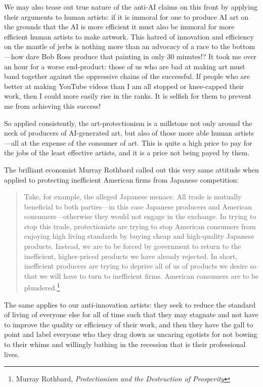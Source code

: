 \documentclass[11pt]{article}
\begin{document}
We may also tease out true nature of the anti-AI claims on this front by applying their arguments to human artists: if it is immoral for one to produce AI art on the grounds that the AI is more efficient it must also be immoral for more efficient human artists to make artwork. This hatred of innovation and efficiency on the mantle of jerbs is nothing more than an advocacy of a race to the bottom---how dare Bob Ross produce that painting in only 30 minutes!? It took me over an hour for a worse end-product: those of us who are bad at making art must band together against the oppressive chains of the successful. If people who are better at making YouTube videos than I am all stopped or knee-capped their work, then I could more easily rise in the ranks. It is selfish for them to prevent me from achieving this success!

So applied consistently, the art-protectionism is a millstone not only around the neck of producers of AI-generated art, but also of those more able human artists---all at the expense of the consumer of art. This is quite a high price to pay for the jobs of the least effective artists, and it is a price not being payed by them.

The brilliant economist Murray Rothbard called out this very same attitude when applied to protecting inefficient American firms from Japanese competition:
\begin{quote}
Take, for example, the alleged Japanese menace. All trade is mutually beneficial to both parties—in this case Japanese producers and American consumers—otherwise they would not engage in the exchange. In trying to stop this trade, protectionists are trying to stop American consumers from enjoying high living standards by buying cheap and high-quality Japanese products. Instead, we are to be forced by government to return to the inefficient, higher-priced products we have already rejected. In short, inefficient producers are trying to deprive all of us of products we desire so that we will have to turn to inefficient firms. American consumers are to be plundered.\footnote{Murray Rothbard, \emph{Protectionism and the Destruction of Prosperity}}
\end{quote}

The same applies to our anti-innovation artists: they seek to reduce the standard of living of everyone else for all of time such that they may stagnate and not have to improve the quality or efficiency of their work, and then they have the gall to point and label everyone who they drag down as uncaring egotists for not bowing to their whims and willingly bathing in the recession that is their professional lives.
\end{document}
